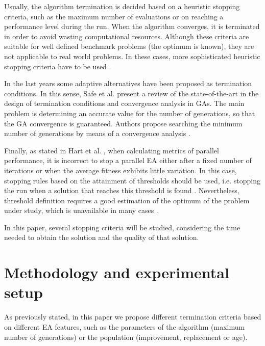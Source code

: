 \documentclass[runningheads,a4paper]{llncs}
\begin{document}
Usually, the algorithm termination is decided based on a heuristic stopping criteria, such as the maximum number of evaluations or on reaching a performance level during the run. 
When the algorithm converges, it is terminated in order to avoid wasting computational resources.
Although these criteria are suitable for well defined benchmark problems (the optimum is known), they are not applicable to real world problems. 
In these cases, more sophisticated heuristic stopping criteria have to be used \cite{NME2909,Wagner2009,Wagner2010}.

In the last years some adaptive alternatives have been proposed  as termination conditions.
In this sense, Safe et al. \cite{Safe2004} present a review of the state-of-the-art in the design of termination conditions and convergence analysis in GAs.
The main problem is determining an accurate value for the number of generations, so that the GA convergence is guaranteed.
Authors propose searching the minimum number of generations by means of a convergence analysis \cite{Rudolph1994}.


Finally, as stated in Hart et al. \cite{Hart1996}, when calculating metrics of parallel performance, it is incorrect to stop a parallel EA either after a fixed number of iterations or when the average fitness exhibits little variation. In this case, stopping rules based on the attainment of thresholds should be used, i.e. stopping the run when a solution that reaches this threshold is found \cite{Sena2001}. Nevertheless, threshold definition requires a good estimation of the optimum of the problem under study, which is unavailable in many cases \cite{Safe2004}.

In this paper, several stopping criteria will be studied, considering the time needed to obtain the solution and the quality of that solution. 


%
%
\section{Methodology and experimental setup}
\label{sec:met}

As previously stated, in this paper we propose different termination criteria based on different EA features, such as the parameters of the algorithm (maximum number of generations) or the population (improvement, replacement or age). 
\end{document}
